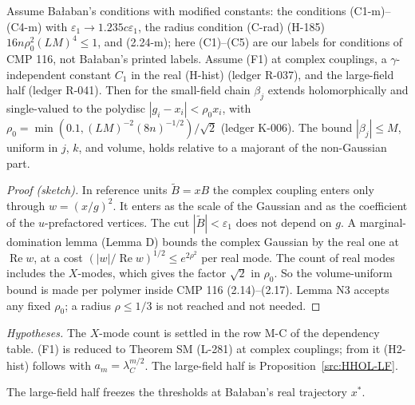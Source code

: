 \begin{proposition}\label{src:HHOL}
Assume Ba{\l}aban's conditions with modified constants: the conditions (C1-m)--(C4-m) with $\varepsilon_1\to1.235c\varepsilon_1$, the radius condition (C-rad) (H-185) $16n\rho_0^2(LM)^4\le1$, and (2.24-m); here (C1)--(C5) are our labels for conditions of CMP 116, not Ba{\l}aban's printed labels. Assume (F1) at complex couplings, a $\gamma$-independent constant $C_1$ in the real (H-hist) (ledger R-037), and the large-field half (ledger R-041). Then for the small-field chain $\beta_j$ extends holomorphically and single-valued to the polydisc $|g_i-x_i|<\rho_0x_i$, with $\rho_0=\min(0.1,(LM)^{-2}(8n)^{-1/2})/\sqrt2$ (ledger K-006). The bound $|\beta_j|\le M$, uniform in $j$, $k$, and volume, holds relative to a majorant of the non-Gaussian part.
\end{proposition}
\begin{proof}[Proof (sketch)]
In reference units $\tilde B=xB$ the complex coupling enters only through $w=(x/g)^2$. It enters as the scale of the Gaussian and as the coefficient of the $u$-prefactored vertices. The cut $|\tilde B|<\varepsilon_1$ does not depend on $g$. A marginal-domination lemma (Lemma D) bounds the complex Gaussian by the real one at $\operatorname{Re}w$, at a cost $(|w|/\operatorname{Re}w)^{1/2}\le e^{2\rho^2}$ per real mode. The count of real modes includes the $X$-modes, which gives the factor $\sqrt2$ in $\rho_0$. So the volume-uniform bound is made per polymer inside CMP 116 (2.14)--(2.17). Lemma N3 accepts any fixed $\rho_0$; a radius $\rho\le1/3$ is not reached and not needed.
\end{proof}
\emph{Hypotheses.} The $X$-mode count is settled in the row M-C of the dependency table. (F1) is reduced to Theorem SM (L-281) at complex couplings; from it (H2-hist) follows with $a_m=\lambda_C^{m/2}$. The large-field half is Proposition~\ref{src:HHOL-LF}.

The large-field half freezes the thresholds at Ba{\l}aban's real trajectory $x^*$.

